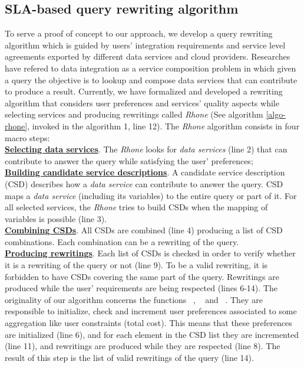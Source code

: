 \subsection{SLA-based query rewriting algorithm}
To serve a proof of concept to our approach, we develop a query
rewriting algorithm which is guided by users' integration requirements and
service level agreements exported by different data services and cloud
providers. Researches have refered to data integration as a service composition problem
in which given a query the objective is to lookup and compose data services that
can contribute to produce a result. Currently, we have formalized and developed a rewriting
algorithm that considers user preferences and services' quality aspects while
selecting services and producing rewritings called \textit{Rhone} (See algorithm
\ref{algo-rhone}, invoked in the algorithm 1, line 12).
The \textit{Rhone} algorithm consists in four macro steps: 
\\
\textbf{\underline{Selecting data services}}. The \textit{Rhone} looks for
\textit{data services} (line 2) that can contribute to answer the query while
satisfying the user' preferences; \\
\textbf{\underline{Building candidate service descriptions}}. A candidate
service description (CSD) describes how a \textit{data service} can contribute to answer the query. CSD maps a \textit{data service} (including its variables) to the entire query or part of it. For all selected services, the \textit{Rhone} tries to build CSDs when the mapping of variables is possible (line
3). \\
\textbf{\underline{Combining CSDs}}. All CSDs are combined (line 4) producing a
list of CSD combinations. Each combination can be a rewriting of the query. \\
\textbf{\underline{Producing rewritings}}. Each list of CSDs is checked in order
to verify whether it is a rewriting of the query or not (line 9). To be a
valid rewriting, it is forbidden to have CSDs covering the same part of the query.
Rewritings are produced while the user' requirements are being respected (lines 6-14).
%
The originality of our algorithm concerns the functions ~\!\tqI{}, ~\!\tqT{} and ~\!\tqS{}.     
They are responsible to initialize, check and increment user preferences
associated to some aggregation like user constraints (total cost). This means
that these preferences are initialized (line 6), and for each element in the CSD list they are incremented (line 11), and rewritings are produced while they are respected (line 8).  The result of this step is the list of valid rewritings of the query (line 14).

